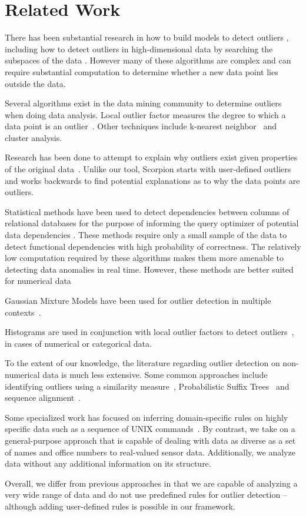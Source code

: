 \section{Related Work}
\label{sec:related-work}

There has been substantial research in how to build models to detect outliers \cite{Aggarwal2013}, including how to detect outliers in high-dimensional data by searching the subspaces of the data \cite{Zhang2004}\cite{Kriegel2009}.
However many of these algorithms are complex and can require substantial computation to determine whether a new data point lies outside the data.

Several algorithms exist in the data mining community to determine outliers when doing data analysis.
Local outlier factor measures the degree to which a data point is an outlier~\cite{Breunig2000}.
Other techniques include k-nearest neighbor~\cite{Ramaswamy2000} and cluster analysis.

Research has been done to attempt to explain why outliers exist given properties of the original data~\cite{Wu}. Unlike our tool, Scorpion starts with user-defined outliers and works backwards to find potential explanations as to why the data points are outliers.

Statistical methods have been used to detect dependencies between columns of relational databases for the purpose of informing the query optimizer of potential data dependencies \cite{Ilyas2004}. These methods require only a small sample of the data to detect functional dependencies with high probability of correctness. The relatively low computation required by these algorithms makes them more amenable to detecting data anomalies in real time. However, these methods are better suited for numerical data~\cite{Hodge2004}

Gaussian Mixture Models have been used for outlier detection in multiple contexts~\cite{Lu2005,Roberts1994,Roberts1999}.

Histograms are used in conjunction with local outlier factors to detect outliers~\cite{Gebski2007,Sheng2007}, in cases of numerical or categorical data.

To the extent of our knowledge, the literature regarding outlier detection on non-numerical data is much less extensive. Some common approaches include identifying outliers using a similarity measure~\cite{Budalakoti2006}, Probabilistic Suffix Trees~\cite{Sun2006} and sequence alignment~\cite{Bouarfa2012}.

Some specialized work has focused on inferring domain-specific rules on highly specific data such as a sequence of UNIX commands~\cite{Lane1997a,Lane1997b}. By contrast, we take on a general-purpose approach that is capable of dealing with data as diverse as a set of names and office numbers to real-valued sensor data. Additionally, we analyze data without any additional information on its structure.

Overall, we differ from previous approaches in that we are capable of analyzing a very wide range of data and do not use predefined rules for outlier detection -- although adding user-defined rules is possible in our framework.
